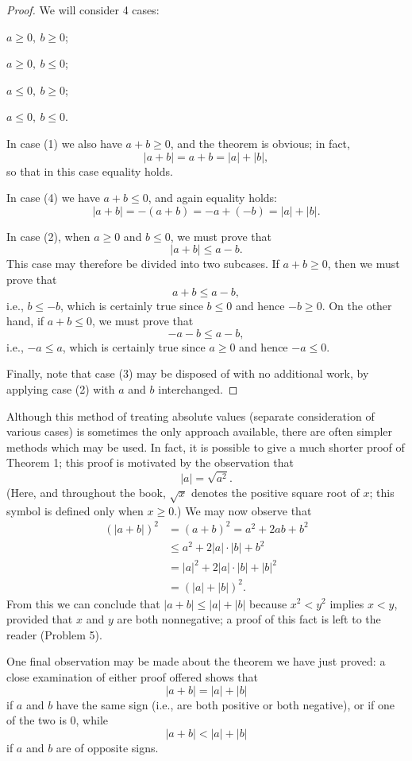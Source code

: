 \begin{proof}
We will consider 4 cases:
\begin{romans}
\item $a \geq 0,\ b \geq 0$;
\item $a \geq 0,\ b \leq 0$;
\item $a \leq 0,\ b \geq 0$;
\item $a \leq 0,\ b \leq 0$.
\end{romans}
In case (1) we also have $a+b \geq 0$, and the theorem is obvious; in fact,
\[ |a+b| = a+b = |a|+|b|, \]
so that in this case equality holds.

In case (4) we have $a+b \leq 0$, and again equality holds:
\[ |a+b| = -(a+b) = -a+(-b) = |a|+|b|. \]

In case (2), when $a \geq 0$ and $b \leq 0$, we must prove that
\[ |a+b| \leq a - b. \]
This case may therefore be divided into two subcases. If $a+b \geq 0$, then we
must prove that
\[ a+b \leq a-b, \]
i.e., $b \leq -b$, which is certainly true since $b \leq 0$ and hence
$-b \geq 0$. On the other hand, if $a+b \leq 0$, we must prove that
\[ -a-b \leq a-b, \]
i.e., $-a \leq a$, which is certainly true since $a \geq 0$ and hence
$-a \leq 0$.

Finally, note that case (3) may be disposed of with no additional work, by
applying case (2) with $a$ and $b$ interchanged.
\end{proof}

Although this method of treating absolute values (separate consideration of
various cases) is sometimes the only approach available, there are often
simpler methods which may be used. In fact, it is possible to give a much
shorter proof of Theorem 1; this proof is motivated by the observation that
\[ |a| = \sqrt{a^2}. \]
(Here, and throughout the book, $\sqrt{x}$ denotes the positive square root
of $x$; this symbol is defined only when $x \geq 0$.) We may now observe that
\begin{align*}
(|a+b|)^2 &= (a+b)^2 = a^2 + 2ab + b^2\\
&\leq a^2 + 2|a| \cdot |b| + b^2\\
&= |a|^2 + 2|a| \cdot |b| + |b|^2\\
&= (|a|+|b|)^2.
\end{align*}
From this we can conclude that $|a+b| \leq |a|+|b|$ because $x^2 < y^2$
implies $x < y$, provided that $x$ and $y$ are both nonnegative; a proof of
this fact is left to the reader (Problem 5).

One final observation may be made about the theorem we have just proved: a
close examination of either proof offered shows that
\[ |a+b| = |a|+|b| \]
if $a$ and $b$ have the same sign (i.e., are both positive or both negative),
or if one of the two is $0$, while
\[ |a+b| < |a|+|b| \]
if $a$ and $b$ are of opposite signs.

